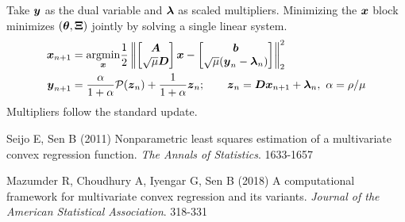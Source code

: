 \documentclass{article}
\begin{document}
Take $\boldsymbol{y}$ as the dual variable and $\boldsymbol{\lambda}$ as scaled multipliers.
Minimizing the $\boldsymbol{x}$ block minimizes $(\boldsymbol{\theta},\boldsymbol{\Xi})$ jointly by solving a single linear system.
\begin{align*}
    \boldsymbol{x}_{n+1}
    &=
    \underset{\boldsymbol{x}}{\mathop{\rm argmin}\nolimits} \frac{1}{2} \left\|
        \begin{bmatrix}
        \boldsymbol{A} \\
        \sqrt{\mu} \boldsymbol{D}
        \end{bmatrix} \boldsymbol{x}
        -
        \begin{bmatrix}
        \boldsymbol{b} \\
        \sqrt{\mu} (\boldsymbol{y}_{n} - \boldsymbol{\lambda}_{n})
        \end{bmatrix}
    \right\|_{2}^{2} \\
    \boldsymbol{y}_{n+1}
    &= \frac{\alpha}{1+\alpha} \mathcal{P}(\boldsymbol{z}_{n}) + \frac{1}{1+\alpha} \boldsymbol{z}_{n};
    \qquad \boldsymbol{z}_{n} = \boldsymbol{D} \boldsymbol{x}_{n+1} + \boldsymbol{\lambda}_{n},~\alpha = \rho / \mu
    \end{align*}
Multipliers follow the standard update.

\begin{thebibliography}{99}
    Seijo E, Sen B (2011) {Nonparametric least squares estimation of a multivariate convex regression function}. {\it The Annals of Statistics}. 1633-1657

    Mazumder R, Choudhury A, Iyengar G, Sen B (2018) {A computational framework for multivariate convex regression and its variants}. {\it Journal of the American Statistical Association}. 318-331
\end{thebibliography}
\end{document}
